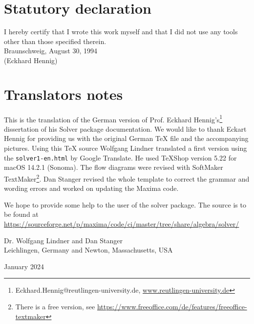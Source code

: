 \documentclass[11pt]{report}           %
\begin{document}
\chapter*{Statutory declaration}
I hereby certify that I wrote this work myself and that I did not use any tools other than
those specified therein.\\[\baselineskip]
Braunschweig, August 30, 1994\\[\baselineskip]
(Eckhard Hennig)

\chapter*{Translators notes}
\thispagestyle{empty}

This is the translation of the German version of Prof. Eckhard {\sc Hennig}'s\footnote{Eckhard.Hennig@reutlingen-university.de, \url{
www.reutlingen-university.de}
} dissertation of his Solver package documentation. 
We would like to thank Eckart Hennig for providing us with the original German TeX file and the accompanying pictures.
Using this TeX source Wolfgang Lindner translated a first version using the {\tt solver1-en.html} by Google Translate. He used  TeXShop version 5.22 for macOS 14.2.1 (Sonoma). The flow diagrams were revised with SoftMaker {\sc TextMaker}\footnote{There is a free version, see \url{https://www.freeoffice.com/de/features/freeoffice-textmaker}}. 
Dan Stanger revised the whole template to correct the grammar and wording errors and worked on updating the Maxima code. 

We hope to provide some help to the user of the solver package.
The source is to be found at 
\url{https://sourceforge.net/p/maxima/code/ci/master/tree/share/algebra/solver/}
 

\vspace{1cm}

\noindent Dr. Wolfgang Lindner  and Dan Stanger  \\
Leichlingen, Germany and Newton, Massachusetts, USA

\noindent January 2024

\cleardoublepage
\end{document}
